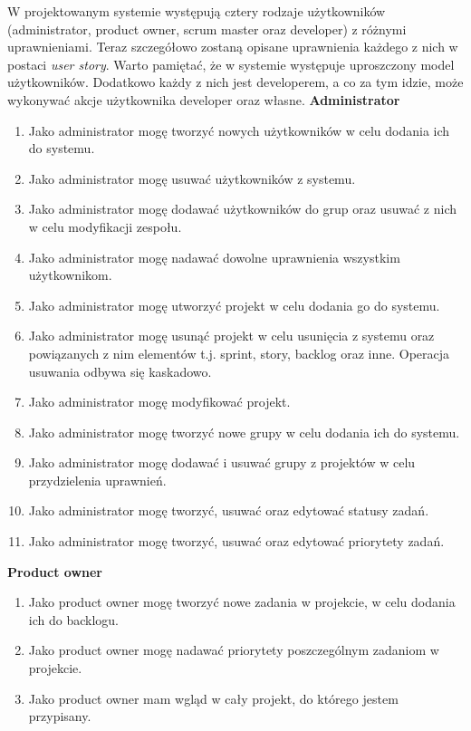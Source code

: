 W projektowanym systemie występują cztery rodzaje użytkowników (administrator, product owner, scrum master oraz developer) z różnymi uprawnieniami. Teraz szczegółowo zostaną opisane uprawnienia każdego z nich w postaci \textit{user story}. Warto pamiętać, że w systemie występuje uproszczony model użytkowników. Dodatkowo każdy z nich jest developerem, a co za tym idzie, może wykonywać akcje użytkownika developer oraz własne.
	\newline
	\newline
	\textbf{Administrator}
	\begin{enumerate}	
		\item Jako administrator mogę tworzyć nowych użytkowników w celu dodania ich do systemu.
		\item Jako administrator mogę usuwać użytkowników z systemu.
		\item Jako administrator mogę dodawać użytkowników do grup oraz usuwać z nich w celu modyfikacji zespołu.
		\item Jako administrator mogę nadawać dowolne uprawnienia wszystkim użytkownikom.		
		\item Jako administrator mogę utworzyć projekt w celu dodania go do systemu.
		\item Jako administrator mogę usunąć projekt w celu usunięcia z systemu oraz powiązanych z nim elementów t.j. sprint, story, backlog oraz inne. Operacja usuwania odbywa się kaskadowo.
		\item Jako administrator mogę modyfikować projekt.		
		\item Jako administrator mogę tworzyć nowe grupy w celu dodania ich do systemu.		
		\item Jako administrator mogę dodawać i usuwać grupy z projektów w celu przydzielenia uprawnień.
		\item Jako administrator mogę tworzyć, usuwać oraz edytować statusy zadań.
		\item Jako administrator mogę tworzyć, usuwać oraz edytować priorytety zadań.
	\end{enumerate}		
	\textbf{Product owner}
	\begin{enumerate}		
		\item Jako product owner mogę tworzyć nowe zadania w projekcie, w celu dodania ich do backlogu.
		\item Jako product owner mogę nadawać priorytety poszczególnym zadaniom w projekcie.
		\item Jako product owner mam wgląd w cały projekt, do którego jestem przypisany.
	\end{enumerate}	
